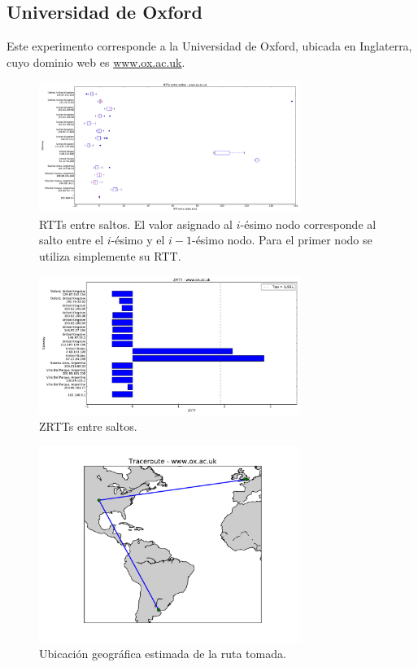 \subsection{Universidad de Oxford}

Este experimento corresponde a la Universidad de Oxford, ubicada en Inglaterra, cuyo dominio web es \url{www.ox.ac.uk}.

\begin{figure}[H]
    \centering
    \includegraphics[width=8.5cm]{img/grafico1-www-ox-ac-uk.pdf}
    \caption{\normalfont RTTs entre saltos. El valor asignado al $i$-ésimo nodo corresponde al salto entre el $i$-ésimo y el $i - 1$-ésimo nodo. Para el primer nodo se utiliza simplemente su RTT.}
\end{figure}

\begin{figure}[H]
    \centering
    \includegraphics[width=8.5cm]{img/grafico2-www-ox-ac-uk.pdf}
    \caption{\normalfont ZRTTs entre saltos.}
\end{figure}

\begin{figure}[H]
    \centering
    \includegraphics[width=8.5cm]{img/grafico3-www-ox-ac-uk.pdf}
    \caption{\normalfont Ubicación geográfica estimada de la ruta tomada.}
\end{figure}

